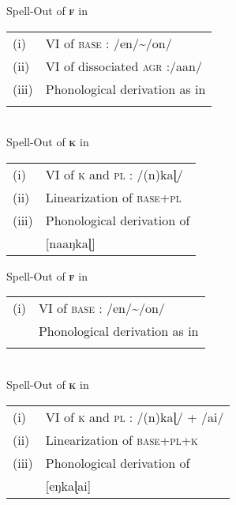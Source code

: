 \documentclass[output=paper]{langscibook}
\begin{document}
\begin{exe}
\ex
\begin{xlist}
    \ex \label{new24c}
    Spell-Out of \textsc{\textbf{f}} in  \rightarrow\ 
    \begin{tabular}[t]{@{}l@{~}l@{}} (i) & VI of \textsc{base} : /en/\textasciitilde/on/ \\
                                     (ii) & VI of dissociated \textsc{agr} :/aan/ \\
                                     (iii) & Phonological derivation as in \\
                                           & \figref{new17} \\\end{tabular}\smallskip\\
    Spell-Out of \textsc{\textbf{k}} in \figref{new24a} \rightarrow\ \begin{tabular}[t]{@{}l@{~}l@{}} (i) & VI of \textsc{k} and \textsc{pl} : /(n)kaɭ/ \\
                                                                                      (ii) & Linearization of \textsc{base+pl} \\
                                                                                     (iii) & Phonological derivation of \\
                                                                                           & [naaŋkaɭ]\\
                                                                                     \end{tabular}
         
    \ex \label{new24d}
    Spell-Out of \textsc{\textbf{f}} in  \rightarrow\ \begin{tabular}[t]{@{}l@{~}l@{}} (i) & VI of \textsc{base} : /en/\textasciitilde/on/ \\
                                                                    & Phonological derivation as in \\
                                                                 & \figref{new22a} \\\end{tabular}\smallskip\\
     Spell-Out of \textsc{\textbf{k}} in \figref{new24b}  \rightarrow\ \begin{tabular}[t]{@{}l@{~}l@{}} (i) & VI of \textsc{k} and \textsc{pl} : /(n)kaɭ/ + /ai/ \\
                                                                     (ii)  & Linearization of \textsc{base+pl+k}\\
                                                                     (iii) & Phonological derivation of \\
                                                                           & [eŋkaɭai] \end{tabular}
    \end{xlist}
\end{exe}\largerpage[2]
\end{document}
